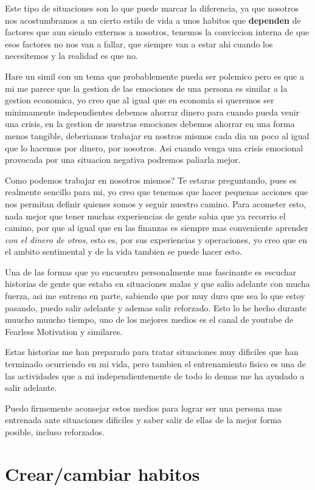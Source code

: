 Este tipo de situaciones son lo que puede marcar la diferencia, ya que nosotros nos acostumbramos a un cierto estilo de vida a unos habitos que \textbf{dependen} de factores que aun siendo externos a nosotros, tenemos la conviccion interna de que esos factores no nos van a fallar, que siempre van a estar ahi cuando los necesitemos y la realidad es que no.

Hare un simil con un tema que probablemente pueda ser polemico pero es que a mi me parece que la gestion de las emociones de una persona es similar a la gestion economica, yo creo que al igual que en economia si queremos ser minimamente independientes debemos ahorrar dinero para cuando pueda venir una crisis, en la gestion de nuestras emociones debemos ahorrar en una forma menos tangible, deberiamos trabajar en nostros mismos cada dia un poco al igual que lo hacemos por dinero, por nosotros. Asi cuando venga una crisis emocional provocada por una situacion negativa podremos paliarla mejor.

Como podemos trabajar en nosotros mismos? Te estaras preguntando, pues es realmente sencillo para mi, yo creo que tenemos que hacer pequenas acciones que nos permitan definir quienes somos y seguir nuestro camino. Para acometer esto, nada mejor que tener muchas experiencias de gente sabia que ya recorrio el camino, por que al igual que en las finanzas es siempre mas conveniente aprender \textit{con el dinero de otros}, esto es, por sus experiencias y operaciones, yo creo que en el ambito sentimental y de la vida tambien se puede hacer esto.

Una de las formas que yo encuentro personalmente mas fascinante es escuchar historias de gente que estaba en situaciones malas y que salio adelante con mucha fuerza, asi me entreno en parte, sabiendo que por muy duro que sea lo que estoy pasando, puedo salir adelante y ademas salir reforzado. Esto lo he hecho durante muucho muucho tiempo, uno de los mejores medios es el canal de youtube de Fearless Motivation y similares.

Estas historias me han preparado para tratar situaciones muy dificiles que han terminado ocurriendo en mi vida, pero tambien el entrenamiento fisico es una de las actividades que a mi independientemente de todo lo demas me ha ayudado a salir adelante.

Puedo firmemente aconsejar estos medios para lograr ser una persona mas entrenada ante situaciones dificiles y saber salir de ellas de la mejor forma posible, incluso reforzados. 
\section{ Crear/cambiar habitos}

